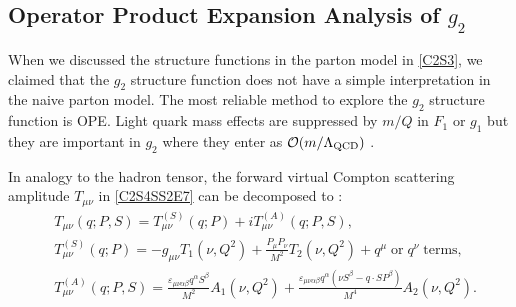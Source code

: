 \subsection{\texorpdfstring{Operator Product Expansion Analysis of $g_2$}{Operator Product Expansion Analysis of g2}}

When we discussed the structure functions in the parton model in \cref{C2S3}, we claimed that the $g_2$ structure function does not have a simple interpretation in the naive parton model. The most reliable method to explore the $g_2$ structure function is OPE. Light quark mass effects are suppressed by $m/Q$ in $F_1$ or $g_1$ but they are important in $g_2$ where they enter as $\order{m/\Lambda_{\mathrm{QCD}}}$ \cite{Jaffe1991}.

In analogy to the hadron tensor, the forward virtual Compton scattering amplitude $T_{\mu\nu}$ in \cref{C2S4SS2E7} can be decomposed to \cite{Jaffe1990}:
\begin{align} \label{C3S2SS1E1}
& T_{\mu\nu}(q;P,S) = T_{\mu\nu}^{(S)}(q;P) + iT_{\mu\nu}^{(A)}(q;P,S), \\ \label{C3S2SS1E2}
& T_{\mu\nu}^{(S)}(q;P) = -g_{\mu\nu}T_1(\nu,Q^2)+\frac{P_\mu P_\nu}{M^2}T_2(\nu,Q^2)+q^\mu\;\mathrm{or}\; q^\nu\;\mathrm{terms}, \\ \label{C3S2SS1E3}
& T_{\mu\nu}^{(A)}(q;P,S) = \frac{\varepsilon_{\mu\nu\alpha\beta}q^\alpha S^\beta}{M^2}A_1(\nu,Q^2)+\frac{\varepsilon_{\mu\nu\alpha\beta}q^\alpha(\nu S^\beta-q\cdot SP^\beta)}{M^4}A_2(\nu,Q^2).
\end{align}

